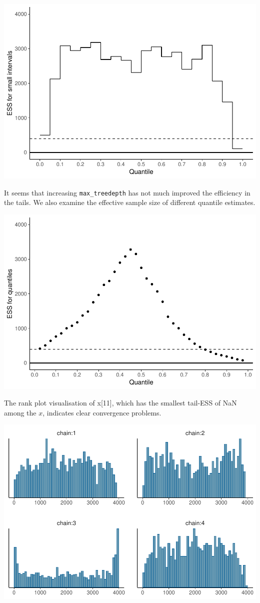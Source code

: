 \documentclass[american,]{article}
\begin{document}
\includegraphics{graphics/local-ess-fit-nom-td20-1.pdf}

It seems that increasing \texttt{max\_treedepth} has not much improved
the efficiency in the tails. We also examine the effective sample size
of different quantile estimates.

\includegraphics{graphics/quantile-ess-fit-nom-td20-1.pdf}

The rank plot visualisation of x{[}11{]}, which has the smallest
tail-ESS of NaN among the \(x\), indicates clear convergence problems.

\includegraphics{graphics/hist-fit-nom-td20-1.pdf}
\end{document}
